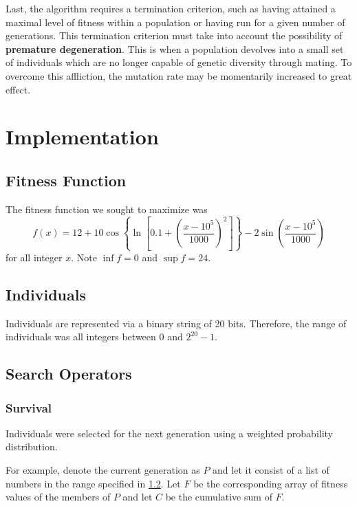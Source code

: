 \documentclass{article}
\begin{document}
  Last, the algorithm requires a termination criterion, such as having
  attained a maximal level of fitness within a population or having run for a
  given number of generations. This termination criterion must take into account
  the possibility of \textbf{premature degeneration}. This is when a population
  devolves into a small set of individuals which are no longer capable of
  genetic diversity through mating. To overcome this affliction, the mutation
  rate may be momentarily increased to great effect.

\section{Implementation}
  \subsection{Fitness Function}
    The fitness function we sought to maximize was
    $$
      f(x)= 12 +
      10\cos\left\{
        \ln\left[0.1 + \left(
          \frac{x-{10}^5}{1000}
        \right)^2
        \right]
      \right\}
      -2\sin\left(
        \frac{x-{10}^5}{1000}
      \right)
    $$
    for all integer $x$. Note $\inf{f}=0$ and $\sup{f}=24$.

  \subsection{Individuals}\label{individual-ranges}
    Individuals are represented via a binary string of 20 bits. Therefore, the
    range of individuals was all integers between $0$ and $2^{20}-1$.

  \subsection{Search Operators}
    \subsubsection{Survival}
      Individuals were selected for the next generation using a weighted
      probability distribution.

      For example, denote the current generation as $P$ and let it consist
      of a list of numbers in the range specified in \ref{individual-ranges}.
      Let $F$ be the corresponding array of fitness values of the members of
      $P$ and let $C$ be the cumulative sum of $F$.
      
\end{document}
